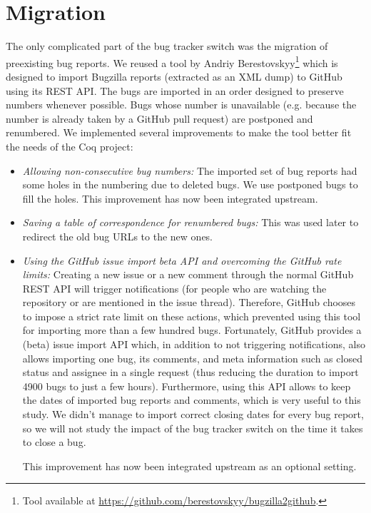 \documentclass[conference]{IEEEtran}
\begin{document}
\section{Migration}
\label{migration}

The only complicated part of the bug tracker switch was the migration of preexisting bug reports. We reused a tool by Andriy Berestovskyy\footnote{Tool available at \url{https://github.com/berestovskyy/bugzilla2github}.} which is designed to import Bugzilla reports (extracted as an XML dump) to GitHub using its REST API. The bugs are imported in an order designed to preserve numbers whenever possible. Bugs whose number is unavailable (e.g. because the number is already taken by a GitHub pull request) are postponed and renumbered. We implemented several improvements to make the tool better fit the needs of the Coq project:
\begin{itemize}
\item \textit{Allowing non-consecutive bug numbers:} The imported set of bug reports had some holes in the numbering due to deleted bugs. We use postponed bugs to fill the holes. This improvement has now been integrated upstream.
\item \textit{Saving a table of correspondence for renumbered bugs:} This was used later to redirect the old bug URLs to the new ones.
\item \textit{Using the GitHub issue import beta API and overcoming the GitHub rate limits:} Creating a new issue or a new comment through the normal GitHub REST API will trigger notifications (for people who are watching the repository or are mentioned in the issue thread). Therefore, GitHub chooses to impose a strict rate limit on these actions, which prevented using this tool for importing more than a few hundred bugs. Fortunately, GitHub provides a (beta) issue import API which, in addition to not triggering notifications, also allows importing one bug, its comments, and meta information such as closed status and assignee in a single request (thus reducing the duration to import 4900 bugs to just a few hours). Furthermore, using this API allows to keep the dates of imported bug reports and comments, which is very useful to this study. We didn't manage to import correct closing dates for every bug report, so we will not study the impact of the bug tracker switch on the time it takes to close a bug.

This improvement has now been integrated upstream as an optional setting.
\end{itemize}
\end{document}
